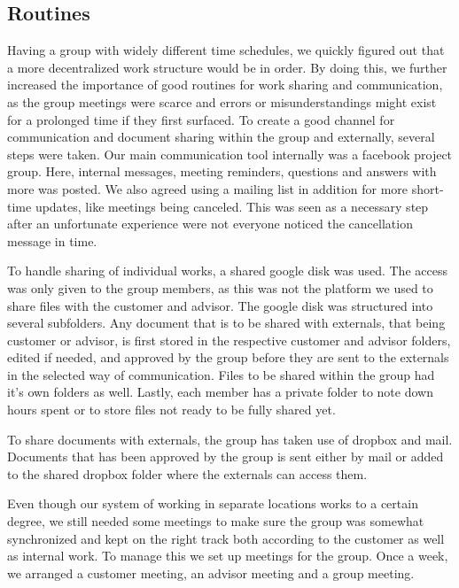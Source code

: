 \documentclass[11pt]{book}
\begin{document}
\subsection{Routines}
Having a group with widely different time schedules, we quickly figured out that a more decentralized work structure would be in order. By doing this, we further increased the importance of good routines for work sharing and communication, as the group meetings were scarce and errors or misunderstandings might exist for a prolonged time if they first surfaced.
To create a good channel for communication and document sharing within the group and externally, several steps were taken. Our main communication tool internally was a facebook project group. Here, internal messages, meeting reminders, questions and answers with more was posted. We also agreed using a mailing list in addition for more short-time updates, like meetings being canceled. This was seen as a necessary step after an unfortunate experience were not everyone noticed the cancellation message in time.

To handle sharing of individual works, a shared google disk was used. The access was only given to the group members, as this was not the platform we used to share files with the customer and advisor. The google disk was structured into several subfolders. Any document that is to be shared with externals, that being customer or advisor, is first stored in the respective customer and advisor folders, edited if needed, and approved by the group before they are sent to the externals in the selected way of communication. Files to be shared within the group had it's own folders as well. Lastly, each member has a private folder to note down hours spent or to store files not ready to be fully shared yet.

To share documents with externals, the group has taken use of dropbox and mail. Documents that has been approved by the group is sent either by mail or added to the shared dropbox folder where the externals can access them.

Even though our system of working in separate locations works to a certain degree, we still needed some meetings to make sure the group was somewhat synchronized and kept on the right track both according to the customer as well as internal work.
To manage this we set up meetings for the group. Once a week, we arranged a customer meeting, an advisor meeting and a group meeting.
\end{document}
